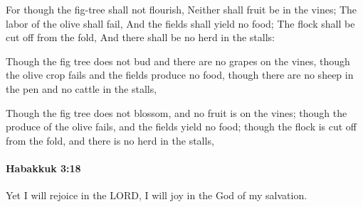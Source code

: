 			\begin{versebox}
					\item[BHS] 
					\item[LXX] 
					\item[ASV] For though the fig-tree shall not flourish, Neither shall fruit be in the vines; The labor of the olive shall fail, And the fields shall yield no food; The flock shall be cut off from the fold, And there shall be no herd in the stalls:
					\item[NIV] Though the fig tree does not bud and there are no grapes on the vines, though the olive crop fails and the fields produce no food, though there are no sheep in the pen and no cattle in the stalls,
					\item[NRSV] Though the fig tree does not blossom, and no fruit is on the vines; though the produce of the olive fails, and the fields yield no food; though the flock is cut off from the fold, and there is no herd in the stalls,
			\end{versebox}

		\paragraph{Habakkuk 3:18} %
			\label{HABAKKUK-3-18}

			Yet I will rejoice in the LORD, I will joy in the God of my salvation.

